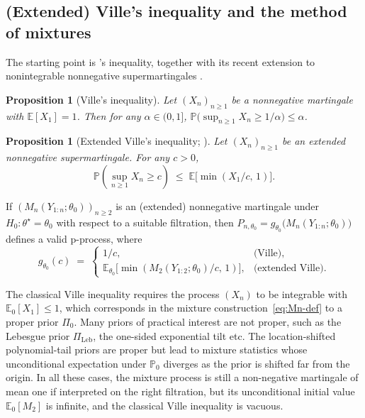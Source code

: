 \documentclass[12pt, a4paper]{report}
\newcommand{\E}{\mathbb{E}}
\newcommand{\Prob}{\mathbb{P}}
\newtheorem{proposition}[theorem]{Proposition}
\newcommand{\1}{\mathbf{1}}
\begin{document}
\subsection{(Extended) Ville's inequality and the method of mixtures}

The starting point is \cite{ville1939etude}'s inequality, together with its recent extension to nonintegrable nonnegative supermartingales
\citep{wang2025extended}.

\begin{proposition}[Ville's inequality]\label{prop:ville}
Let \((X_n)_{n\geq 1}\) be a nonnegative martingale with
\(\E[X_1]=1\). Then for any \(\alpha\in(0,1]\),
\(\Prob\bigl(\sup_{n\geq 1} X_n\geq 1/\alpha\bigr)\leq\alpha\).
\end{proposition}

\begin{proposition}[Extended Ville's inequality;
{\cite[Thm.~4.1]{wang2025extended}}]
\label{prop:eville}
Let \((X_n)_{n\geq 1}\) be an extended nonnegative supermartingale.
For any \(c>0\),
\[
   \Prob\left(\sup_{n\geq 1} X_n\geq c\right)\;\leq\;
   \E\!\bigl[\min(X_1/c,\,1)\bigr].
\]
\end{proposition}

If \((M_n(Y_{1:n};\theta_0))_{n\geq 2}\) is an (extended) nonnegative
martingale under \(H_0:\theta^\star=\theta_0\) with respect to a
suitable filtration, then
\(P_{n,\theta_0}=g_{\theta_0}\bigl(M_n(Y_{1:n};\theta_0)\bigr)\)
defines a valid p-process, where
\begin{equation}\label{eq:gtheta0}
  g_{\theta_0}(c)\;=\;
   \begin{cases}
     1/c, & \text{(Ville)},\\[2pt]
     \E_{\theta_0}\!\bigl[\min(M_2(Y_{1:2};\theta_0)/c,\,1)\bigr],
       & \text{(extended Ville)}.
   \end{cases}
\end{equation}

The classical Ville inequality requires the process
\((X_n)\) to be integrable with \(\E_0[X_1]\leq 1\), which corresponds
in the mixture construction~\eqref{eq:Mn-def} to a proper prior \(\Pi_0\). Many priors of practical interest are not proper, such as the Lebesgue prior \(\Pi_{\mathrm{Leb}}\), the one-sided
exponential tilt etc. The location-shifted polynomial-tail priors are
proper but lead to mixture statistics whose unconditional expectation
under \(\mathbb{P}_0\) diverges as the prior is shifted far from the origin. In all these cases, the mixture process is still a non-negative
martingale of mean one if interpreted on the right filtration, but its
unconditional initial value \(\E_0[M_2]\) is infinite, and the
classical Ville inequality is vacuous.
\end{document}
